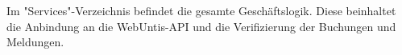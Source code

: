 
Im "Services"-Verzeichnis befindet die gesamte Geschäftslogik. Diese beinhaltet die Anbindung an die WebUntis-API und die Verifizierung der Buchungen und Meldungen.